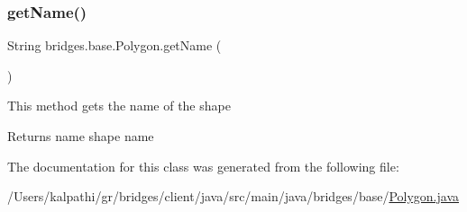 \subsubsection{\texorpdfstring{get\+Name()}{getName()}}
{\footnotesize\ttfamily String bridges.\+base.\+Polygon.\+get\+Name (\begin{DoxyParamCaption}{ }\end{DoxyParamCaption})}

This method gets the name of the shape

\begin{DoxyReturn}{Returns}
name shape name 
\end{DoxyReturn}


The documentation for this class was generated from the following file\+:\begin{DoxyCompactItemize}
\item 
/\+Users/kalpathi/gr/bridges/client/java/src/main/java/bridges/base/\mbox{\hyperlink{_polygon_8java}{Polygon.\+java}}\end{DoxyCompactItemize}
